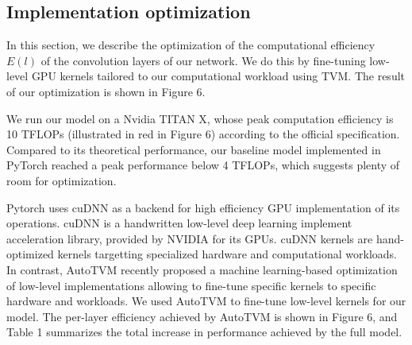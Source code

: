 \documentclass[runningheads]{llncs}
\begin{document}
\subsection{Implementation optimization}

In this section, we describe the optimization of the computational efficiency $E(l)$ of the convolution layers of our network.
We do this by fine-tuning low-level GPU kernels tailored to our computational workload using TVM.
The result of our optimization is shown in Figure 6.

We run our model on a Nvidia TITAN X, whose peak computation efficiency is 10 TFLOPs (illustrated in red in Figure 6) according to the official specification.
Compared to its theoretical performance, our baseline model implemented in PyTorch reached a peak performance below 4 TFLOPs,
which suggests plenty of room for optimization.

Pytorch uses cuDNN as a backend for high efficiency GPU implementation of its operations.
cuDNN \cite{chetlur2014cudnn} is a handwritten low-level deep learning implement acceleration library, provided by NVIDIA for its GPUs. 
cuDNN kernels are hand-optimized kernels targetting specialized hardware and computational workloads. 
In contrast, AutoTVM \cite{chen2018tvm} recently proposed a machine learning-based optimization of low-level implementations 
allowing to fine-tune specific kernels to specific hardware and workloads.
We used AutoTVM to fine-tune low-level kernels for our model.
The per-layer efficiency achieved by AutoTVM is shown in Figure 6, and Table 1 summarizes the total increase in performance achieved by the full model.
\end{document}
